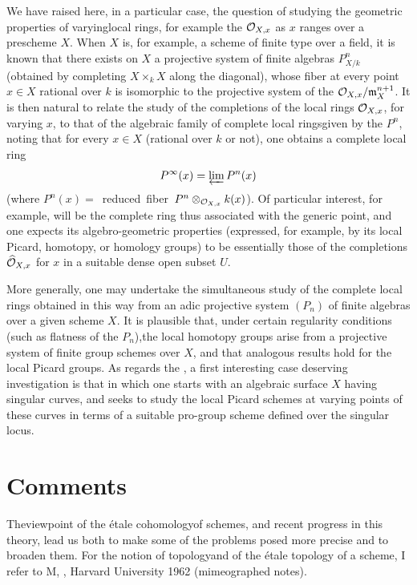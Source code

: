 We have raised here, in a particular case, the question of studying the geometric properties of \og varying\fg local rings, for example the $\mathcal O_{X,x}$ as $x$ ranges over a prescheme $X$. When $X$ is, for example, a scheme of finite type over a field, it is known that there exists on $X$ a projective system of finite algebras $P^n_{X/k}$ (obtained by completing $X\times_k X$ along the diagonal), whose fiber at every point $x\in X$ rational over $k$ is isomorphic to the projective system of the $\mathcal O_{X,x}/\mathfrak{m}_X^{n+1}$. It is then natural to relate the study of the completions of the local rings $\mathcal O_{X,x}$, for varying $x$, to that of the \og algebraic family of complete local rings\fg given by the $P^n$, noting that for every $x\in X$ (rational over $k$ or not), one obtains a complete local ring
$$
P^{\infty}(x)=\varprojlim P^n(x)
$$
(where $P^n(x)=$~reduced~fiber~$P^n\otimes_{\mathcal O_{X,x}}k(x)$). Of particular interest, for example, will be the complete ring thus associated with the generic point, and one expects its algebro-geometric properties (expressed, for example, by its local Picard, homotopy, or homology groups) to be essentially those of the completions $\widehat{\mathcal O}_{X,x}$ for $x$ in a suitable dense open subset $U$.

More generally, one may undertake the simultaneous study of the complete local rings obtained in this way from an adic projective system $(P_n)$ of finite algebras over a given scheme $X$. It is plausible that, under certain regularity conditions (such as flatness of the $P_n$),\pageoriginale the local homotopy groups arise from a projective system of finite group schemes over $X$, and that analogous results hold for the local Picard groups. As regards the , a first interesting case deserving investigation is that in which one starts with an algebraic surface $X$ having singular curves, and seeks to study the local Picard schemes at varying points of these curves in terms of a suitable pro-group scheme defined over the singular locus.

\section[Comments]{Comments\protect\sfootnotemark} \label{XIII.6}

The\pageoriginale viewpoint of the \og \'etale cohomology\fg of schemes, and recent progress in this theory, lead us both to make some of the problems posed more precise and to broaden them. For the notion of \og topology\fg and of the \og \'etale topology of a scheme\fg, I refer to M\ptbl{}, , Harvard University 1962 (mimeographed notes).

